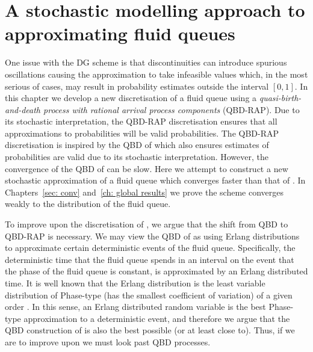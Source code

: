 \chapter{A stochastic modelling approach to approximating fluid queues\label{sec: construction and modelling}}
One issue with the DG scheme is that discontinuities can introduce spurious oscillations causing the approximation to take infeasible values which, in the most serious of cases, may result in probability estimates outside the interval \([0,1]\). In this chapter we develop a new discretisation of a fluid queue using a \emph{quasi-birth-and-death process with rational arrival process components} (QBD-RAP). Due to its stochastic interpretation, the QBD-RAP discretisation ensures that all approximations to probabilities will be valid probabilities. The QBD-RAP discretisation is inspired by the QBD of \cite{bo2013} which also ensures estimates of probabilities are valid due to its stochastic interpretation. However, the convergence of the QBD of \cite{bo2013} can be slow. Here we attempt to construct a new stochastic approximation of a fluid queue which converges faster than that of \cite{bo2013}. In Chapters~\ref{sec: conv} and~\ref{ch: global results} we prove the scheme converges weakly to the distribution of the fluid queue. 

To improve upon the discretisation of \cite{bo2013}, we argue that the shift from QBD to QBD-RAP is necessary. We may view the QBD of \cite{bo2013} as using Erlang distributions to approximate certain deterministic events of the fluid queue. Specifically, the deterministic time that the fluid queue spends in an interval on the event that the phase of the fluid queue is constant, is approximated by an Erlang distributed time. It is well known that the Erlang distribution is the least variable distribution of Phase-type (has the smallest coefficient of variation) of a given order \citep{as1987}. In this sense, an Erlang distributed random variable is the best Phase-type approximation to a deterministic event, and therefore we argue that the QBD construction of \cite{bo2013} is also the best possible (or at least close to). Thus, if we are to improve upon \cite{bo2013} we must look past QBD processes. 

